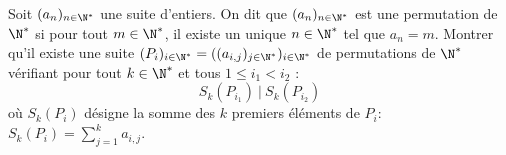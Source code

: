 Soit $(a_n)_{n\in \N^*}$ une suite d'entiers. On dit que $(a_n)_{n\in \N^*}$ est une permutation de $\N^*$ si pour tout $m\in \N^*$, il existe un unique $n\in \N^*$ tel que $a_n = m$. Montrer qu'il existe une suite $(P_i)_{i\in \N^*}=((a_{i, j})_{j\in \N^*})_{i\in \N^*}$ de permutations de $\N^*$ vérifiant pour tout $k\in \N^*$ et tous $1 \le i_1 < i_2$ :
$$S_k(P_{i_1})~|~S_k(P_{i_2})$$
où $S_k(P_i)$ désigne la somme des $k$ premiers éléments de $P_i$: $S_k(P_i)=\sum\limits_{j=1}^{k} a_{i, j}$.